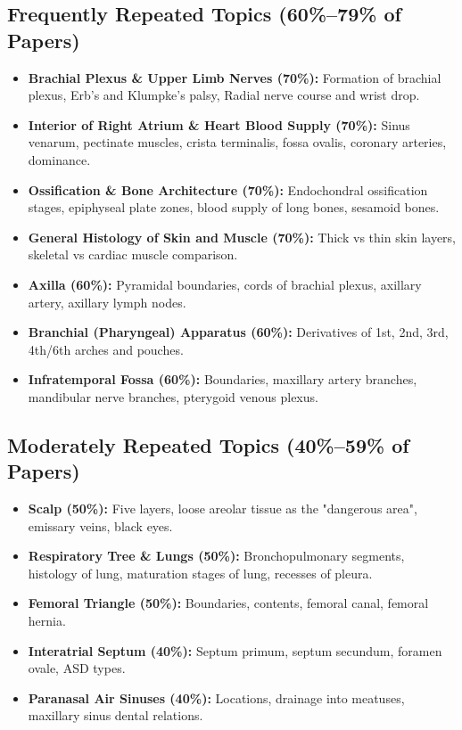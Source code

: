 \documentclass[11pt,a4paper]{article}
\begin{document}
\subsection{Frequently Repeated Topics (60\%--79\% of Papers)}
\begin{itemize}[leftmargin=*]
    \item \textbf{Brachial Plexus \& Upper Limb Nerves (70\%):} Formation of brachial plexus, Erb's and Klumpke's palsy, Radial nerve course and wrist drop.
    \item \textbf{Interior of Right Atrium \& Heart Blood Supply (70\%):} Sinus venarum, pectinate muscles, crista terminalis, fossa ovalis, coronary arteries, dominance.
    \item \textbf{Ossification \& Bone Architecture (70\%):} Endochondral ossification stages, epiphyseal plate zones, blood supply of long bones, sesamoid bones.
    \item \textbf{General Histology of Skin and Muscle (70\%):} Thick vs thin skin layers, skeletal vs cardiac muscle comparison.
    \item \textbf{Axilla (60\%):} Pyramidal boundaries, cords of brachial plexus, axillary artery, axillary lymph nodes.
    \item \textbf{Branchial (Pharyngeal) Apparatus (60\%):} Derivatives of 1st, 2nd, 3rd, 4th/6th arches and pouches.
    \item \textbf{Infratemporal Fossa (60\%):} Boundaries, maxillary artery branches, mandibular nerve branches, pterygoid venous plexus.
\end{itemize}

\subsection{Moderately Repeated Topics (40\%--59\% of Papers)}
\begin{itemize}[leftmargin=*]
    \item \textbf{Scalp (50\%):} Five layers, loose areolar tissue as the "dangerous area", emissary veins, black eyes.
    \item \textbf{Respiratory Tree \& Lungs (50\%):} Bronchopulmonary segments, histology of lung, maturation stages of lung, recesses of pleura.
    \item \textbf{Femoral Triangle (50\%):} Boundaries, contents, femoral canal, femoral hernia.
    \item \textbf{Interatrial Septum (40\%):} Septum primum, septum secundum, foramen ovale, ASD types.
    \item \textbf{Paranasal Air Sinuses (40\%):} Locations, drainage into meatuses, maxillary sinus dental relations.
\end{itemize}
\end{document}
